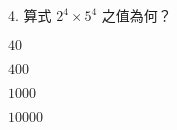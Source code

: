 \documentclass[12pt]{article}
\begin{document}
\begin{problem}
  \item[4.] 算式 $2^4 \times 5^4$ 之值為何？
  \begin{choices}
    \item $40$
    \item $400$
    \item $1000$
    \item $10000$
  \end{choices}
\end{problem}
\end{document}
